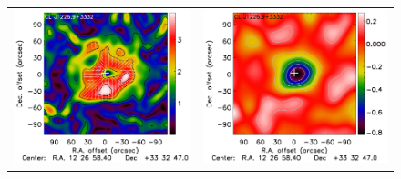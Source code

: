 \documentclass[traditabstract]{aa}
\begin{document}
\begin{figure}[h]
{\begin{tabular}{ll}
\includegraphics[trim=0cm 2.2cm 0cm 0cm, clip=true, scale=1]{Figure/Grad_CLJ1227_20_30_60_noannot.pdf} & 
\includegraphics[trim=2.3cm 2.2cm 0cm 0cm, clip=true, scale=1]{Figure/DoG_CLJ1227_20_30_60_noannot.pdf} \\

\end{tabular}}
\end{figure}
\end{document}
